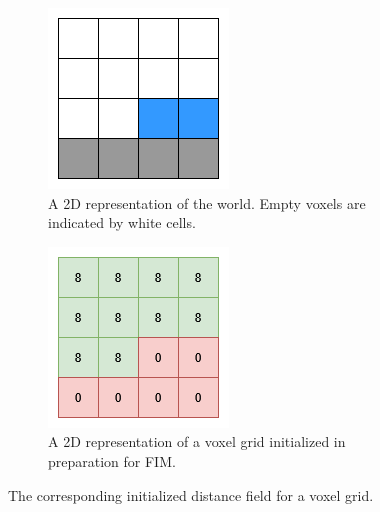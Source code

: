 \begin{figure}[htbp]
    \centering
    \begin{subfigure}[t]{0.32\textwidth}
        \centering
        \includegraphics[width=\textwidth]{figures/voxel_grid.drawio.png}
        \caption{A 2D representation of the world. Empty voxels are indicated by white cells.}
    \end{subfigure}
    \hfill
    \begin{subfigure}[t]{0.32\textwidth}
        \centering
        \includegraphics[width=\textwidth]{figures/voxel_grid_fmm_init.drawio.png}
        \caption{A 2D representation of a voxel grid initialized in preparation for FIM.}
    \end{subfigure}
    \caption{The corresponding initialized distance field for a voxel grid.}
    \label{fig:fim_init}
\end{figure}

